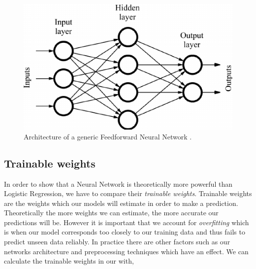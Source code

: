 \begin  {figure}[!htpb]
\centering
  \includegraphics[width=0.9\linewidth]{Credit_Images/Sample-of-a-feed-forward-neural-network.png}
   \caption{Architecture of a generic Feedforward Neural Network \cite{inbook}.}
    \label{fig-ff-nn}
\end{figure}

\subsection{Trainable weights}
In order to show that a Neural Network is theoretically more powerful than Logistic Regression, we have to compare their \emph{trainable weights}. Trainable weights are the weights which our models will estimate in order to make a prediction. Theoretically the more weights we can estimate, the more accurate our predictions will be. However it is important that we account for \emph{overfitting} which is when our model corresponds too closely to our training data and thus fails to predict unseen data reliably. In practice there are other factors such as our networks architecture and preprocessing techniques which have an effect. We can calculate the trainable weights in our with,

